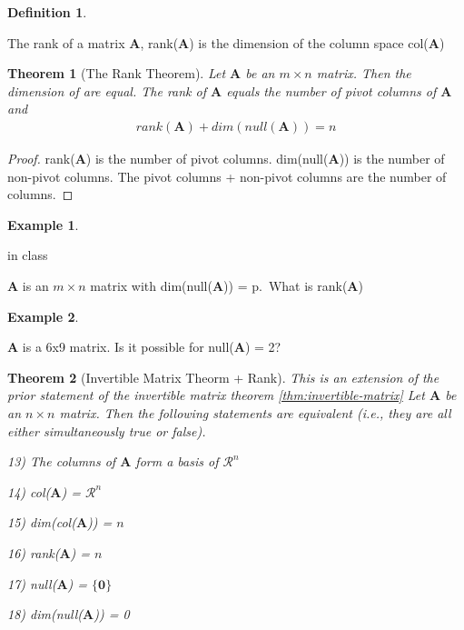\documentclass[
]{book}
\newtheorem{theorem}{Theorem}[chapter]
\theoremstyle{definition}
\newtheorem{definition}{Definition}[chapter]
\theoremstyle{definition}
\newtheorem{example}{Example}[chapter]
\theoremstyle{definition}
\theoremstyle{remark}
\begin{document}
\begin{definition}
\protect\hypertarget{def:unlabeled-div-153}{}\label{def:unlabeled-div-153}

The rank of a matrix \(\mathbf{A}\), rank(\(\mathbf{A}\)) is the dimension of the column space col(\(\mathbf{A}\))

\end{definition}

\begin{theorem}[The Rank Theorem]
\protect\hypertarget{thm:unnamed-chunk-237}{}{\label{thm:unnamed-chunk-237} {} }Let \(\mathbf{A}\) be an \(m \times n\) matrix. Then the dimension of are equal. The rank of \(\mathbf{A}\) equals the number of pivot columns of \(\mathbf{A}\) and
\[
\begin{aligned}
rank (\mathbf{A}) + dim(null(\mathbf{A})) = n
\end{aligned}
\]
\end{theorem}

\begin{proof}
{}rank(\(\mathbf{A}\)) is the number of pivot columns. dim(null(\(\mathbf{A}\))) is the number of non-pivot columns. The pivot columns + non-pivot columns are the number of columns.
\end{proof}

\begin{example}
\protect\hypertarget{exm:unlabeled-div-154}{}\label{exm:unlabeled-div-154}

in class

\(\mathbf{A}\) is an \(m \times n\) matrix with dim(null(\(\mathbf{A}\))) = p.~What is rank(\(\mathbf{A}\))

\end{example}

\begin{example}
\protect\hypertarget{exm:unlabeled-div-155}{}\label{exm:unlabeled-div-155}

\(\mathbf{A}\) is a 6x9 matrix. Is it possible for null(\(\mathbf{A}\)) = 2?

\end{example}

\begin{theorem}[Invertible Matrix Theorm + Rank]
\protect\hypertarget{thm:unnamed-chunk-239}{}{\label{thm:unnamed-chunk-239} {} }This is an extension of the prior statement of the invertible matrix theorem \ref{thm:invertible-matrix}
Let \(\mathbf{A}\) be an \(n \times n\) matrix. Then the following statements are equivalent (i.e., they are all either simultaneously true or false).

13) The columns of \(\mathbf{A}\) form a basis of \(\mathcal{R}^n\)

14) col(\(\mathbf{A}\)) = \(\mathcal{R}^n\)

15) dim(col(\(\mathbf{A}\))) = \(n\)

16) rank(\(\mathbf{A}\)) = \(n\)

17) null(\(\mathbf{A}\)) = \(\{\mathbf{0}\}\)

18) dim(null(\(\mathbf{A}\))) = 0
\end{theorem}
\end{document}
